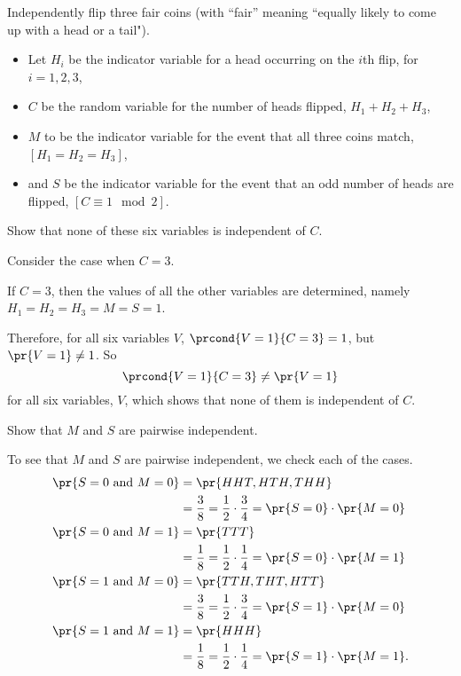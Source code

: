 \begin{problem}
Independently flip three fair coins (with ``fair'' meaning ``equally likely to come
up with a head or a tail").
\begin{itemize}
\item Let $H_i$ be the indicator variable for a head occurring on the $i$th flip, for $i=1,2,3$,
\item $C$ be the random variable for the number of heads flipped, $H_1+H_2+H_3$,
\item $M$ to be the indicator variable for the event that all three coins match, $[H_1=H_2=H_3]$,
\item and $S$ be the indicator variable for the event that an odd number of heads are flipped, $[C \equiv 1 \mod 2]$.
\end{itemize}

\bparts

\ppart\label{depC} Show that none of these six variables is independent of $C$.

\hint Consider the case when $C=3$.

\begin{solution}
If $C=3$, then the values of all the other variables are determined, namely $H_1=H_2=H_3=M=S=1$.  

Therefore, for all six variables $V$, $\prcond{V=1}{C=3} = 1$, but $\pr{V=1}\neq 1$. So
\[
\prcond{V=1}{C=3} \neq \pr{V=1}
\]
for all six variables, $V$, which shows that none of them is independent of $C$.
\end{solution}

\ppart Show that $M$ and $S$ are pairwise independent.

\begin{solution}
To see that $M$ and $S$ are pairwise independent, we check each of the cases.
\begin{align*}
\pr{S=0 \text{ and } M=0} & = \pr{HHT,HTH,THH}\\
    & = \frac{3}{8} = \frac{1}{2} \cdot \frac{3}{4} =\pr{S=0} \cdot \pr{M = 0}\\
\pr{S=0 \text{ and } M=1} & = \pr{TTT}\\
    & = \frac{1}{8} = \frac{1}{2} \cdot \frac{1}{4} =\pr{S=0} \cdot \pr{M = 1}\\
\pr{S=1 \text{ and } M=0} & = \pr{TTH,THT,HTT}\\
    & = \frac{3}{8} = \frac{1}{2} \cdot \frac{3}{4} =\pr{S = 1} \cdot \pr{M = 0}\\
\pr{S=1 \text{ and } M=1} & = \pr{HHH}\\
    & = \frac{1}{8} = \frac{1}{2} \cdot \frac{1}{4} =\pr{S = 1} \cdot \pr{M = 1}.
\end{align*}
\end{solution}


\end{problem}
